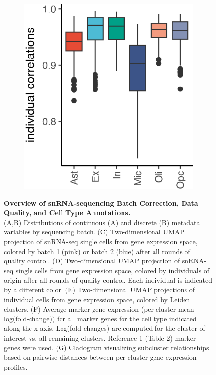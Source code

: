 \begin{figure}[ht]
\begin{subfigure}[t]{.2\textwidth}
        \includegraphics[width=\textwidth]{./extended_plots/individual_correlations.png}        
    \end{subfigure}       
    \caption{
        \textbf{Overview of snRNA-sequencing Batch Correction, Data Quality, and Cell Type Annotations.}\\[1ex]
        (A,B) Distributions of continuous (A) and discrete (B) metadata variables by sequencing batch. 
        (C) Two-dimensional UMAP projection of snRNA-seq single cells from gene expression space, colored by batch 1 (pink) or batch 2 (blue) after all rounds of quality control. 
        (D) Two-dimensional UMAP projection of snRNA-seq single cells from gene expression space, colored by individuals of origin after all rounds of quality control. Each individual is indicated by a different color. 
        (E) Two-dimensional UMAP projections of individual cells from gene expression space, colored by Leiden clusters. 
        (F) Average marker gene expression (per-cluster mean log(fold-change)) for all marker genes for the cell type indicated along the x-axis. Log(fold-changes) are computed for the cluster of interest vs. all remaining clusters. Reference 1 (Table 2) marker genes were used. 
        (G) Cladogram visualizing subcluster relationships based on pairwise distances between per-cluster gene expression profiles. 
}
\end{figure}
